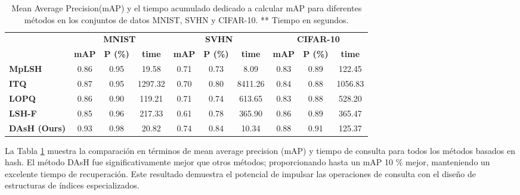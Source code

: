 \begin{table}[ht]
\caption{Mean Average Precision(mAP) y el tiempo acumulado dedicado a calcular mAP para diferentes métodos en los conjuntos de datos MNIST, SVHN y CIFAR-10. ** Tiempo en segundos.  }
\label{table:map}
\centering
\begin{footnotesize}
\begin{tabular}{l|c|c|c|c|c|c|c|c|c|}
\cline{2-10}
                                           & \multicolumn{3}{c|}{\textbf{MNIST}}            & \multicolumn{3}{c|}{\textbf{SVHN}}             & \multicolumn{3}{c|}{\textbf{CIFAR-10}}         \\ \cline{2-10} 
                                           & \textbf{mAP} & \textbf{P (\%)} & \textbf{time} & \textbf{mAP} & \textbf{P (\%)} & \textbf{time} & \textbf{mAP} & \textbf{P (\%)} & \textbf{time} \\ \hline
\multicolumn{1}{|l|}{\textbf{MpLSH \cite{multiprobe}}}       & 0.86         & 0.95            & 19.58         & 0.71         & 0.73            & 8.09          & 0.83         & 0.89            & 122.45        \\ \hline
\multicolumn{1}{|l|}{\textbf{ITQ \cite{itq}}}         & 0.87         & 0.95            & 1297.32       & 0.70         & 0.80            & 8411.26       & 0.84         & 0.88            & 1056.83       \\ \hline
\multicolumn{1}{|l|}{\textbf{LOPQ \cite{lopq}}}        & 0.86         & 0.90            & 119.21        & 0.71         & 0.74            & 613.65        & 0.83         & 0.88            & 528.20        \\ \hline
\multicolumn{1}{|l|}{\textbf{LSH-F \cite{lshforest}}}       & 0.85         & 0.96            & 217.33        & 0.61         & 0.78            & 365.90        & 0.86         & 0.89            & 365.47        \\ \hline
\multicolumn{1}{|l|}{\textbf{DAsH (Ours)}} & 0.93         & 0.98            & 20.82         & 0.74         & 0.84            & 10.34         & 0.88         & 0.91            & 125.37        \\ \hline
\end{tabular}
\end{footnotesize}
\end{table}
La Tabla  \ref{table:map} muestra la comparación en términos de mean average precision (mAP)  y tiempo de consulta para todos los métodos basados en hash. El método DAsH fue significativamente mejor que otros métodos; proporcionando hasta un mAP 10 \% mejor,  manteniendo un excelente tiempo de recuperación. Este resultado demuestra el potencial de impulsar las operaciones de consulta con el diseño de estructuras de índices especializados.


